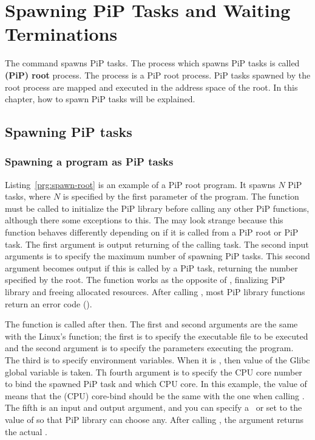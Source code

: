 
\section{Spawning PiP Tasks and Waiting Terminations}

The  command spawns PiP tasks. The
process which spawns PiP tasks is called {\bf (PiP) root} process. The
 process is a PiP root process. 
PiP tasks spawned by the root process are mapped and executed in the
address space of the root. In this chapter, how to spawn PiP tasks
will be explained.

\subsection{Spawning PiP tasks}

\subsubsection{Spawning a program as PiP tasks}

Listing~\ref{prg:spawn-root} is an example of a PiP root program. It
spawns $N$ PiP tasks, where $N$ is specified by the first parameter
of the program. The  function must be called to
initialize the PiP library before calling any other PiP functions,
although there some exceptions to this. The  may
look strange because this function behaves differently depending
on if it is called from a PiP root or PiP task. The first argument is
output returning {\PIPID} of the calling task. The second input
arguments is to specify the maximum number of spawning PiP tasks. This
second argument becomes output if this is called by a PiP task,
returning the number specified by the root.
The  function works as the opposite of
, finalizing PiP library and freeing allocated 
resources. After calling , most PiP library
functions return an error code ().

The  function is called after then. The first and
second arguments are the same with the Linux's 
function; the first is to specify the executable file to be executed
and the second argument is to specify the parameters executing the
program. The third is to specify environment variables. When it is
{\NULL}, then value of the Glibc global variable  is
taken. Th fourth argument is to specify the CPU core number to bind
the spawned PiP task and which CPU core. In this example, the value of
 means that the (CPU) core-bind should be
the same with the one when calling . The fifth
is an input and output argument, and you can specify a \PIPID\ or
set to the value of  so that PiP library can choose
any. After calling , the argument returns the
actual \PIPID. 

